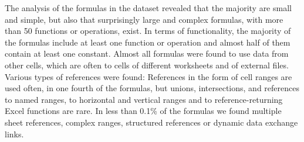 \documentclass[times]{smrauth}
\begin{document}
The analysis of the formulas in the dataset revealed that the majority are small and simple, but also that surprisingly large and complex formulas, with more than 50 functions or operations, exist.
In terms of functionality, the majority of the formulas include at least one function or operation and almost half of them contain at least one constant.
Almost all formulas were found to use data from other cells, which are often to cells of different worksheets and of external files.
Various types of references were found: References in the form of cell ranges are used often, in one fourth of the formulas, but unions, intersections, and references to named ranges, to horizontal and vertical ranges and to reference-returning Excel functions are rare.
In less than 0.1\% of the formulas we found multiple sheet references, complex ranges, structured references or dynamic data exchange links.



\end{document}
